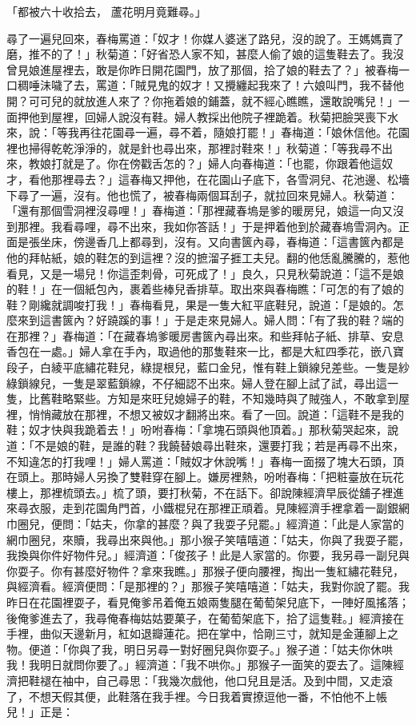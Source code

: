 「都被六十收拾去，  蘆花明月竟難尋。」

尋了一遍兒回來，春梅罵道：「奴才！你媒人婆迷了路兒，沒的說了。王媽媽賣了磨，推不的了！」秋菊道：「好省恐人家不知，甚麼人偷了娘的這隻鞋去了。我沒曾見娘進屋裡去，敢是你昨日開花園門，放了那個，拾了娘的鞋去了？」被春梅一口稠唾沬噦了去，罵道：「賊見鬼的奴才！又攪纏起我來了！六娘叫門，我不替他開？可可兒的就放進人來了？你拖着娘的鋪蓋，就不經心瞧瞧，還敢說嘴兒！」一面押他到屋裡，回婦人說沒有鞋。婦人教採出他院子裡跪着。秋菊把臉哭喪下水來，說：「等我再往花園尋一遍，尋不着，隨娘打罷！」春梅道：「娘休信他。花園裡也掃得乾乾淨淨的，就是針也尋出來，那裡討鞋來！」秋菊道：「等我尋不出來，教娘打就是了。你在傍戳舌怎的？」婦人向春梅道：「也罷，你跟着他這奴才，看他那裡尋去？」這春梅又押他，在花園山子底下，各雪洞兒、花池邊、松墻下尋了一遍，沒有。他也慌了，被春梅兩個耳刮子，就拉回來見婦人。秋菊道：「還有那個雪洞裡沒尋哩！」春梅道：「那裡藏春塢是爹的暖房兒，娘這一向又沒到那裡。我看尋哩，尋不出來，我如你答話！」于是押着他到於藏春塢雪洞內。正面是張坐床，傍邊香几上都尋到，沒有。又向書篋內尋，春梅道：「這書篋內都是他的拜帖紙，娘的鞋怎的到這裡？沒的摭溜子捱工夫兒。翻的他恁亂騰騰的，惹他看見，又是一場兒！你這歪刺骨，可死成了！」良久，只見秋菊說道：「這不是娘的鞋！」在一個紙包內，裹着些棒兒香排草。取出來與春梅瞧：「可怎的有了娘的鞋？剛纔就調唆打我！」春梅看見，果是一隻大紅平底鞋兒，說道：「是娘的。怎麼來到這書篋內？好蹺蹊的事！」于是走來見婦人。婦人問：「有了我的鞋？端的在那裡？」春梅道：「在藏春塢爹暖房書篋內尋出來。和些拜帖子紙、排草、安息香包在一處。」婦人拿在手內，取過他的那隻鞋來一比，都是大紅四季花，嵌八寶段子，白綾平底繡花鞋兒，綠提根兒，藍口金兒，惟有鞋上鎖線兒差些。一隻是紗綠鎖線兒，一隻是翠藍鎖線，不仔細認不出來。婦人登在腳上試了試，尋出這一隻，比舊鞋略緊些。方知是來旺兒媳婦子的鞋，不知幾時與了賊強人，不敢拿到屋裡，悄悄藏放在那裡，不想又被奴才翻將出來。看了一回。說道：「這鞋不是我的鞋；奴才快與我跪着去！」吩咐春梅：「拿塊石頭與他頂着。」那秋菊哭起來，說道：「不是娘的鞋，是誰的鞋？我饒替娘尋出鞋來，還要打我；若是再尋不出來，不知違怎的打我哩！」婦人罵道：「賊奴才休說嘴！」春梅一面掇了塊大石頭，頂在頭上。那時婦人另換了雙鞋穿在腳上。嫌房裡熱，吩咐春梅：「把粧臺放在玩花樓上，那裡梳頭去。」梳了頭，要打秋菊，不在話下。卻說陳經濟早辰從舖子裡進來尋衣服，走到花園角門首，小鐵棍兒在那裡正頑着。見陳經濟手裡拿着一副銀網巾圈兒，便問：「姑夫，你拿的甚麼？與了我耍子兒罷。」經濟道：「此是人家當的網巾圈兒，來贖，我尋出來與他。」那小猴子笑嘻嘻道：「姑夫，你與了我耍子罷，我換與你件好物件兒。」經濟道：「俊孩子！此是人家當的。你要，我另尋一副兒與你耍子。你有甚麼好物件？拿來我瞧。」那猴子便向腰裡，掏出一隻紅繡花鞋兒，與經濟看。經濟便問：「是那裡的？」那猴子笑嘻嘻道：「姑夫，我對你說了罷。我昨日在花園裡耍子，看見俺爹吊着俺五娘兩隻腿在葡萄架兒底下，一陣好風搖落；後俺爹進去了，我尋俺春梅姑姑要菓子，在葡萄架底下，拾了這隻鞋。」經濟接在手裡，曲似天邊新月，紅如退瓣蓮花。把在掌中，恰剛三寸，就知是金蓮腳上之物。便道：「你與了我，明日另尋一對好圈兒與你耍子。」猴子道：「姑夫你休哄我！我明日就問你要了。」經濟道：「我不哄你。」那猴子一面笑的耍去了。這陳經濟把鞋褪在袖中，自己尋思：「我幾次戲他，他口兒且是活。及到中間，又走滾了，不想天假其便，此鞋落在我手裡。今日我着實撩逗他一番，不怕他不上帳兒！」正是：

